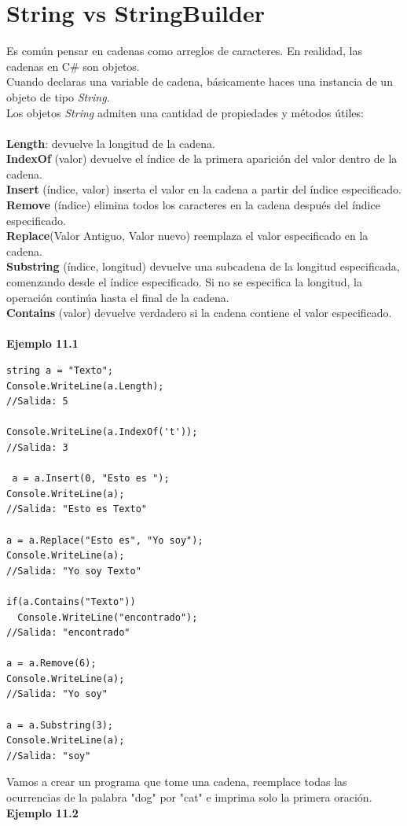 \documentclass[12pt,a4paper]{report}
\begin{document}
\section{String vs StringBuilder}
Es común pensar en cadenas como arreglos de caracteres. En realidad, las cadenas en C\# son objetos.\\Cuando declaras una variable de cadena, básicamente haces una instancia de un objeto de tipo\textit{ String}.\\Los objetos\textit{ String} admiten una cantidad de propiedades y métodos útiles:\\\\\textbf{ Length}: devuelve la longitud de la cadena.\\\textbf{ IndexOf} (valor) devuelve el índice de la primera aparición del valor dentro de la cadena.\\\textbf{ Insert} (índice, valor) inserta el valor en la cadena a partir del índice especificado.\\\textbf{ Remove} (índice) elimina todos los caracteres en la cadena después del índice especificado.\\\textbf{ Replace}(Valor Antiguo, Valor nuevo) reemplaza el valor especificado en la cadena.\\\textbf{ Substring} (índice, longitud) devuelve una subcadena de la longitud especificada, comenzando desde el índice especificado. Si no se especifica la longitud, la operación continúa hasta el final de la cadena.\\\textbf{ Contains} (valor) devuelve verdadero si la cadena contiene el valor especificado.\\\\\textbf{Ejemplo 11.1}
\begin{lstlisting}
string a = "Texto";
Console.WriteLine(a.Length);
//Salida: 5

Console.WriteLine(a.IndexOf('t'));
//Salida: 3

 a = a.Insert(0, "Esto es ");
Console.WriteLine(a);
//Salida: "Esto es Texto"

a = a.Replace("Esto es", "Yo soy");
Console.WriteLine(a);
//Salida: "Yo soy Texto"

if(a.Contains("Texto"))
  Console.WriteLine("encontrado");
//Salida: "encontrado"

a = a.Remove(6);
Console.WriteLine(a);
//Salida: "Yo soy"

a = a.Substring(3);
Console.WriteLine(a);
//Salida: "soy"
\end{lstlisting}Vamos a crear un programa que tome una cadena, reemplace todas las ocurrencias de la palabra "dog" por "cat" e imprima solo la primera oración.\\\textbf{Ejemplo 11.2}
\end{document}
